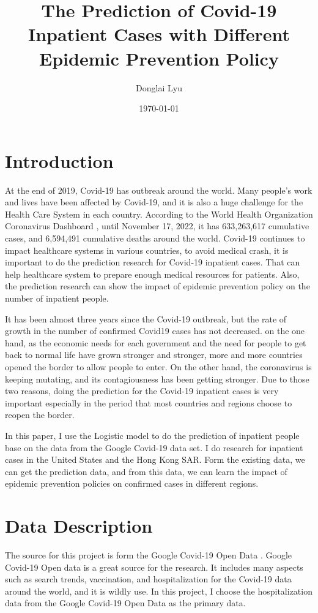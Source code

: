 \documentclass[12pt]{article}
\title{The Prediction of Covid-19 Inpatient Cases with Different Epidemic Prevention Policy}
\author{Donglai Lyu}
\date{\today}
\begin{document}
\maketitle
	\clearpage
	\section{Introduction}
	
	At the end of 2019, Covid-19 has outbreak around the world. Many people's work and lives have been affected by Covid-19, and it is also a huge challenge for the Health Care System in each country. According to the World Health Organization Coronavirus Dashboard \cite{1}, until November 17, 2022, it has 633,263,617 cumulative cases, and 6,594,491 cumulative deaths around the world. Covid-19 continues to impact healthcare systems in various countries, to avoid medical crash, it is important to do the prediction research for Covid-19 inpatient cases. That can help healthcare system to prepare enough medical resources for patients. Also, the prediction research can show the impact of epidemic prevention policy on the number of inpatient people.
	
	It has been almost three years since the Covid-19 outbreak, but the rate of growth in the number of confirmed Covid19 cases has not decreased. on the one hand, as the economic needs for each government and the need for people to get back to normal life have grown stronger and stronger, more and more countries opened the border to allow people to enter. On the other hand, the coronavirus is keeping mutating, and its contagiousness has been getting stronger. Due to those two reasons, doing the prediction for the Covid-19 inpatient cases is very important especially in the period that most countries and regions choose to reopen the border. 
	
	In this paper, I use the Logistic model to do the prediction of inpatient people base on the data from the Google Covid-19 data set. I do research for inpatient cases in the United States and the Hong Kong SAR. Form the existing data, we can get the prediction data, and from this data, we can learn the impact of epidemic prevention policies on confirmed cases in different regions.
	
	\section{Data Description}
	The source for this project is form the Google Covid-19 Open Data \cite{2}. Google Covid-19 Open data is a great source for the research. It includes many aspects such as search trends, vaccination, and hospitalization for the Covid-19 data around the world, and it is wildly use. In this project, I choose the hospitalization data from the Google Covid-19 Open Data as the primary data.
	
\end{document}
